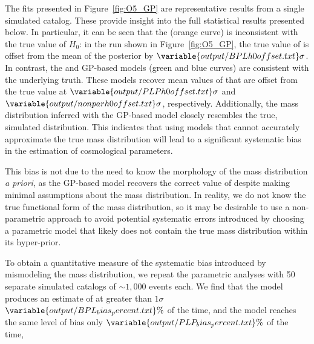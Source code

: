 \documentclass[preprint2,linenumbers]{aastex631}
\begin{document}
The fits presented in Figure~\ref{fig:O5_GP} are representative results from a single simulated catalog.
These provide insight into the full statistical results presented below.
In particular, it can be seen that the \bpl{} (orange curve) is inconsistent with the true value of $H_0$: in the run shown in Figure~\ref{fig:O5_GP}, the true value of \Ho{} is offset from the mean of the posterior by $\variable{output/BPLh0offset.txt}\sigma$.
In contrast, the \plp{} and \ac{GP}-based models (green and blue curves) are consistent with the underlying truth.
These models recover mean values of \Ho{} that are offset from the true value at $\variable{output/PLPh0offset.txt}\sigma$ and $\variable{output/nonparh0offset.txt}\sigma$, respectively. 
Additionally, the mass distribution inferred with the \ac{GP}-based model closely resembles the true, simulated distribution.
This indicates that using models that cannot accurately approximate the true mass distribution will lead to a significant systematic bias in the estimation of cosmological parameters.

This bias is not due to the need to know the morphology of the mass distribution \emph{a priori}, as the \ac{GP}-based model recovers the correct value of \Ho{} despite making minimal assumptions about the mass distribution.
In reality, we do not know the true functional form of the mass distribution, %
so it may be desirable to use a non-parametric approach to avoid potential systematic errors introduced by choosing a parametric model that likely does not contain the true mass distribution within its hyper-prior.

To obtain a quantitative measure of the systematic bias introduced by mismodeling the mass distribution, we repeat the parametric analyses with 50 separate simulated catalogs of $\sim1,000$ events each.
We find that the \bpl{} model produces an estimate of \Ho{} at greater than $1\sigma$ $\variable{output/BPL_bias_percent.txt}\%$ of the time, %
and the \plp{} model reaches the same level of bias only $\variable{output/PLP_bias_percent.txt}\%$ 
of the time, 
\end{document}
